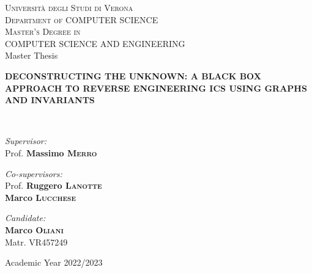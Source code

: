 \documentclass[a4paper,12pt,openright,twoside,titlepage]{book}
\newcommand{\thesistitle}{Deconstructing the Unknown: A Black Box Approach to Reverse Engineering ICS using Graphs and Invariants }
\newcommand{\supervisor}{Prof. \textbf{Massimo \textsc{Merro}}}
\newcommand{\firstcosupervisor}{Prof. \textbf{Ruggero \textsc{Lanotte}}}
\newcommand{\secondcosupervisor}{\textbf{Marco \textsc{Lucchese}}}
\newcommand{\candidate}{\textbf{Marco \textsc{Oliani}}\\ Matr. VR457249}
\newcommand{\academicyear}{\large Academic Year 2022/2023}
\begin{document}
\begin{titlepage}
	\begin{center}
		\thispagestyle{empty}
		
		
		
		\textsc{\LARGE Università degli Studi di Verona}\\
		\textsc{Department of COMPUTER SCIENCE}\\[1.0cm]
		\textsc{\large Master's Degree in \\ 
			COMPUTER SCIENCE AND ENGINEERING}\\[1.5cm]
		
		\large Master Thesis \\[0.5cm]
		
		\hrulefill
		

		{ \Large\bfseries\MakeUppercase{\thesistitle}}
		
		\hrulefill \\[2.0cm]
		
		\begin{minipage}[t]{0.45\textwidth}
			\begin{flushleft} \large
				\emph{Supervisor:}\\
				\supervisor 
			\end{flushleft}
			\begin{flushleft} \large
				\emph{Co-supervisors:}\\
				\firstcosupervisor \\
				\secondcosupervisor
			\end{flushleft}
		\end{minipage}
		\begin{minipage}[t]{0.45\textwidth}\raggedleft
			\begin{flushright} \large
				\emph{Candidate:} \\
				\candidate
			\end{flushright}
		\end{minipage}
		
		\vfill
		
		\academicyear
		
	\end{center}
\end{titlepage}
\end{document}
